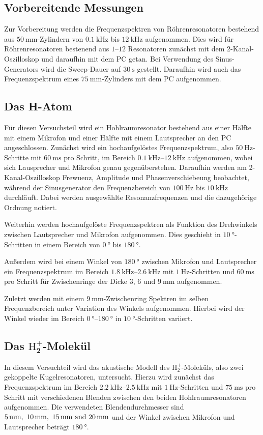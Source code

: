\subsection{Vorbereitende Messungen}
Zur Vorbereitung werden die Frequenzspektren von Röhrenresonatoren bestehend aus $\SI{50}{\mm}$-Zylindern von $\SI{0.1}{\kilo\hertz}$ bis $\SI{12}{\kilo\hertz}$ aufgenommen. Dies wird für Röhrenresonatoren bestenend aus $1$--$12$ Resonatoren zunächst mit dem 2-Kanal-Oszilloskop und daraufhin mit dem PC getan. Bei Verwendung des Sinus-Generators wird die Sweep-Dauer auf $\SI{30}{\second}$ gestellt. Daraufhin wird auch das Frequenzspektrum eines $\SI{75}{\mm}$-Zylinders mit dem PC aufgenommen.

\subsection{Das H-Atom}
Für diesen Versuchsteil wird ein Hohlraumresonator bestehend aus einer Hälfte mit einem Mikrofon und einer Hälfte mit einem Lautsprecher an den PC angeschlossen. Zunächst wird ein hochaufgelöstes Frequenzspektrum, also $\SI{50}{\hertz}$-Schritte mit $\SI{60}{\milli\second}$ pro Schritt, im Bereich $\SIrange{0.1}{12}{\kilo\hertz}$ aufgenommen, wobei sich Lausprecher und Mikrofon genau gegenüberstehen. Daraufhin werden am 2-Kanal-Oszilloskop Frewuenz, Amplitude und Phasenverschiebeung beobachtet, während der Sinusgenerator den Frequenzbereich von $\SI{100}{\hertz}$ bis $\SI{10}{\kilo\hertz}$ durchläuft. Dabei werden ausgewählte Resonanzfrequenzen und die dazugehörige Ordnung notiert.

Weiterhin werden hochaufgelöste Frequenzspektren als Funktion des Drehwinkels zwischen Lautsprecher und Mikrofon aufgenommen. Dies geschieht in $\SI{10}{\degree}$-Schritten in einem Bereich von $\SI{0}{\degree}$ bis $\SI{180}{\degree}$.

Außerdem wird bei einem Winkel von $\SI{180}{\degree}$ zwischen Mikrofon und Lautsprecher ein Frequenzspektrum im Bereich $\SIrange{1.8}{2.6}{\kilo\hertz}$ mit $\SI{1}{\hertz}$-Schritten und $\SI{60}{\milli\second}$ pro Schritt für Zwischenringe der Dicke $\num{3}$, $\num{6}$ und $\SI{9}{\milli\metre}$ aufgenommen.

Zuletzt werden mit einem $\SI{9}{\milli\metre}$-Zwischenring Spektren im selben Frequenzbereich unter Variation des Winkels aufgenommen. Hierbei wird der Winkel wieder im Bereich $\SIrange{0}{180}{\degree}$ in $\SI{10}{\degree}$-Schritten variiert.

\subsection[Das $\mathrm{H}_2^{+}$-Molekül]{Das $\symbf{\mathrm{H}_2^{+}}$-Molekül}
In diesem Versuchteil wird das akustische Modell des $\mathrm{H}_2^+$-Moleküls, also zwei gekoppelte Kugelresonatoren, untersucht. Hierzu wird zunächst das Frequenzspektrum im Bereich $\SIrange{2.2}{2.5}{\kilo\hertz}$ mit $\SI{1}{\hertz}$-Schritten und $\SI{75}{\milli\second}$ pro Schritt mit verschiedenen Blenden zwischen den beiden Hohlraumresonatoren aufgenommen. Die verwendeten Blendendurchmesser sind $\SIlist{5;10;15;20}{\milli\metre}$ und der Winkel zwischen Mikrofon und Lautsprecher beträgt $\SI{180}{\degree}$.

